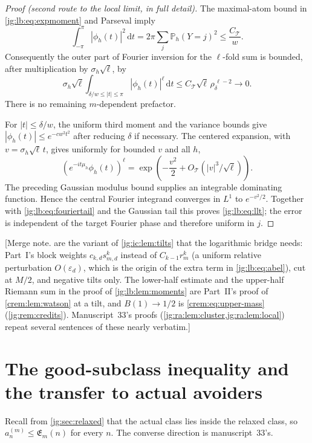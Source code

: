 \documentclass[11pt,a4paper]{article}
\theoremstyle{definition}\newaliascnt{definition}{theorem}
\theoremstyle{remark}\newaliascnt{remark}{theorem}
\newcommand{\eps}{\varepsilon}
\newcommand{\dd}{\mathrm d}
\newcommand{\ljP}{\mathbb P}
\begin{document}
\begin{proof}[Proof (second route to the local limit, in full detail)]
The maximal-atom bound in \eqref{jg:lb:eq:expmoment} and Parseval imply
\begin{equation}\label{jg:lb:eq:parseval}
 \int_{-\pi}^{\pi}|\phi_h(t)|^2\,\dd t
   =2\pi\sum_j\ljP_h(Y=j)^2\le \frac{C_{\mathcal T}}w.
\end{equation}
Consequently the outer part of Fourier inversion for the $\ell$-fold sum is
bounded, after multiplication by $\sigma_h\sqrt\ell$, by
\begin{equation}\label{jg:lb:eq:fouriertail}
 \sigma_h\sqrt\ell
 \int_{\delta/w\le|t|\le\pi}|\phi_h(t)|^\ell\,\dd t
 \le C_{\mathcal T}\sqrt\ell\,\rho_\delta^{\,\ell-2}
 \longrightarrow0.
\end{equation}
There is no remaining $m$-dependent prefactor.

For $|t|\le\delta/w$, the uniform third moment and the variance bounds give
$|\phi_h(t)|\le e^{-cw^2t^2}$ after reducing $\delta$ if necessary. The centered
expansion, with $v=\sigma_h\sqrt\ell\,t$, gives uniformly for bounded $v$ and
all $h$,
\[
 \left(e^{-it\mu_h}\phi_h(t)\right)^\ell
 =\exp\!\left(-\frac{v^2}{2}+O_{\mathcal T}(|v|^3/\sqrt\ell)\right).
\]
The preceding Gaussian modulus bound supplies an integrable dominating
function. Hence the central Fourier integrand converges in $L^1$ to
$e^{-v^2/2}$. Together with \eqref{jg:lb:eq:fouriertail} and the Gaussian tail
this proves \eqref{jg:lb:eq:llt}; the error is independent of the target
Fourier phase and therefore uniform in $j$.
\end{proof}

[Merge note.  are the variant of
\cref{jg:ic:lem:tilts} that the logarithmic bridge needs: Part~I's block weights
$c_{k,d}s_{m,d}^k$ instead of $C_{k-1}r_m^k$ (a uniform relative perturbation
$O(\eps_d)$, which is the origin of the extra term in \eqref{jg:lb:eq:abel}),
cut at $M/2$, and negative tilts only. The lower-half estimate and the upper-half
Riemann sum in the proof of \cref{jg:lb:lem:moments} are Part~II's proof of
\cref{crem:lem:watson} at a tilt, and $B(1)\to1/2$ is
\eqref{crem:eq:upper-mass} (\cref{jg:rem:credits}). Manuscript~33's proofs
(\cref{jg:ra:lem:cluster,jg:ra:lem:local}) repeat several sentences of these
nearly verbatim.]

\section{The good-subclass inequality and the transfer to actual avoiders}
\label{jg:sec:good}
Recall from \cref{jg:sec:relaxed} that the actual class lies inside the
relaxed class, so $a_n^{(m)}\le\mathfrak E_m(n)$ for every $n$. The converse
direction is manuscript~33's.
\end{document}
